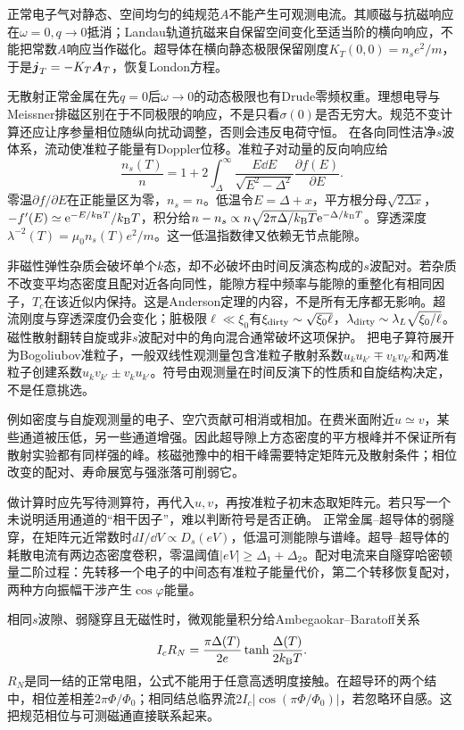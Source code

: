 \label{ch:scresponse}
正常电子气对静态、空间均匀的纯规范$A$不能产生可观测电流。其顺磁与抗磁响应在$\omega=0,q\to0$抵消；Landau轨道抗磁来自保留空间变化至适当阶的横向响应，不能把常数$A$响应当作磁化。超导体在横向静态极限保留刚度$K_T(0,0)=n_se^2/m$，于是$\boldsymbol{j}_T=-K_T\boldsymbol{A}_T$，恢复London方程。

无散射正常金属在先$q=0$后$\omega\to0$的动态极限也有Drude零频权重。理想电导与Meissner排磁区别在于不同极限的响应，不是只看$\sigma(0)$是否无穷大。规范不变计算还应让序参量相位随纵向扰动调整，否则会违反电荷守恒。
在各向同性洁净$s$波体系，流动使准粒子能量有Doppler位移。准粒子对动量的反向响应给
\begin{equation}
\frac{n_s(T)}n=1+2\int_\Delta^\infty\frac{E\dd E}{\sqrt{E^2-\Delta^2}}\frac{\partial f(E)}{\partial E}.
\end{equation}
零温$\partial f/\partial E$在正能量区为零，$n_s=n$。低温令$E=\Delta+x$，平方根分母$\sqrt{2\Delta x}$，$-f'(E)\simeq\mathrm e^{-E/k_{\mathrm B} T}/k_{\mathrm B} T$，积分给$n-n_s\propto n\sqrt{2\pi\Delta/k_{\mathrm B} T}\mathrm e^{-\Delta/k_{\mathrm B} T}$。穿透深度$\lambda^{-2}(T)=\mu_0n_s(T)e^2/m$。这一低温指数律又依赖无节点能隙。

非磁性弹性杂质会破坏单个$k$态，却不必破坏由时间反演态构成的$s$波配对。若杂质不改变平均态密度且配对近各向同性，能隙方程中频率与能隙的重整化有相同因子，$T_c$在该近似内保持。这是Anderson定理的内容，不是所有无序都无影响。超流刚度与穿透深度仍会变化；脏极限$\ell\ll\xi_0$有$\xi_{\rm dirty}\sim\sqrt{\xi_0\ell}$，$\lambda_{\rm dirty}\sim\lambda_L\sqrt{\xi_0/\ell}$。磁性散射翻转自旋或非$s$波配对中的角向混合通常破坏这项保护。
把电子算符展开为Bogoliubov准粒子，一般双线性观测量包含准粒子散射系数$u_ku_{k'}\mp v_kv_{k'}$和两准粒子创建系数$u_kv_{k'}\pm v_ku_{k'}$。符号由观测量在时间反演下的性质和自旋结构决定，不是任意挑选。

例如密度与自旋观测量的电子、空穴贡献可相消或相加。在费米面附近$u\simeq v$，某些通道被压低，另一些通道增强。因此超导隙上方态密度的平方根峰并不保证所有散射实验都有同样强的峰。核磁弛豫中的相干峰需要特定矩阵元及散射条件；相位改变的配对、寿命展宽与强涨落可削弱它。

做计算时应先写待测算符，再代入$u,v$，再按准粒子初末态取矩阵元。若只写一个未说明适用通道的“相干因子”，难以判断符号是否正确。
正常金属--超导体的弱隧穿，在矩阵元近常数时$dI/\dd V\propto D_s(eV)$，低温可测能隙与谱峰。超导--超导体的耗散电流有两边态密度卷积，零温阈值$|eV|\ge\Delta_1+\Delta_2$。配对电流来自隧穿哈密顿量二阶过程：先转移一个电子的中间态有准粒子能量代价，第二个转移恢复配对，两种方向振幅干涉产生$\cos\varphi$能量。

相同$s$波隙、弱隧穿且无磁性时，微观能量积分给Ambegaokar--Baratoff关系
\begin{equation}
I_cR_N=\frac{\pi\Delta(T)}{2e}\tanh\frac{\Delta(T)}{2k_{\mathrm B} T}.
\end{equation}
$R_N$是同一结的正常电阻，公式不能用于任意高透明度接触。在超导环的两个结中，相位差相差$2\pi\Phi/\Phi_0$；相同结总临界流$2I_c|\cos(\pi\Phi/\Phi_0)|$，若忽略环自感。这把规范相位与可测磁通直接联系起来。
